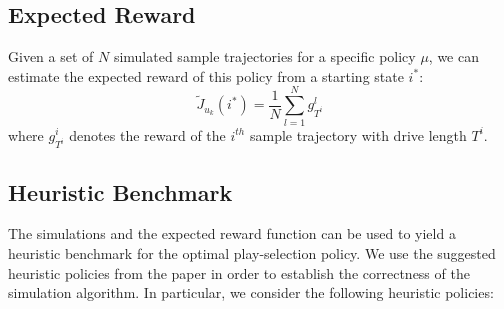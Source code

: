 \documentclass[11pt, oneside]{article}   	%
\begin{document}
\subsection{Expected Reward}
Given a set of $N$ simulated sample trajectories for a specific policy $\mu$, we can estimate the expected reward of this policy from a starting state $i^*$:
$$
\widetilde{J}_{u_k}(i^*) = \frac{1}{N}\sum_{l=1}^N g_{T^i}^l
$$
where $g_{T^i}^i$ denotes the reward of the $i^{th}$ sample trajectory with drive length $T^i$.

\subsection{Heuristic Benchmark}
The simulations and the expected reward function can be used to yield a heuristic benchmark for the optimal play-selection policy. We use the suggested heuristic policies from the paper in order to establish the correctness of the simulation algorithm. In particular, we consider the following heuristic policies:
\end{document}
